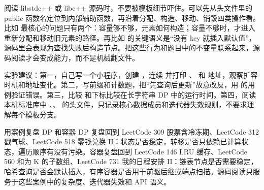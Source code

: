 \begin{deepdive}
阅读 libstdc++ 或 libc++ 源码时，不要被模板细节吓住。可以先从头文件里的 public 函数名定位到内部辅助函数，再沿着分配、构造、移动、销毁四类操作看。比如  最核心的问题只有两个：容量够不够，元素如何构造；容量不够时，才进入重新分配和移动旧元素的路径。再比如  的关键语义是“没有 key 就插入默认值”，源码里会表现为查找失败后构造节点。把这些行为和题目中的不变量联系起来，源码阅读才会变成能力，而不是机械翻文件。
\end{deepdive}

\begin{labbox}
实验建议：第一，自己写一个小程序，创建 ，连续  并打印 、 和  地址，观察扩容时机和地址变化。第二，写前缀和计数题，把“先查询后更新”故意改反，用  的用例验证错误。第三，比较  和下标比较在长字符串 DP 中的运行时间。第四，阅读本机标准库中 、、 的头文件，只记录核心数据成员和迭代器失效规则，不要求理解每个模板分支。
\end{labbox}

\begin{principlebox}{用案例复盘 DP 和容器}
DP 复盘回到 LeetCode 309 股票含冷冻期、LeetCode 312 戳气球、LeetCode 518 零钱兑换 II：状态是否稳定，转移是否只依赖已计算状态，遍历顺序有没有污染。容器复盘回到 LeetCode 146 LRU 缓存、LeetCode 560 和为 K 的子数组、LeetCode 731 我的日程安排 II：链表节点是否需要稳定，哈希查询是否会默认插入，有序容器是否用于前驱后继或端点扫描。源码阅读只服务于这些案例中的复杂度、迭代器失效和 API 语义。
\end{principlebox}









